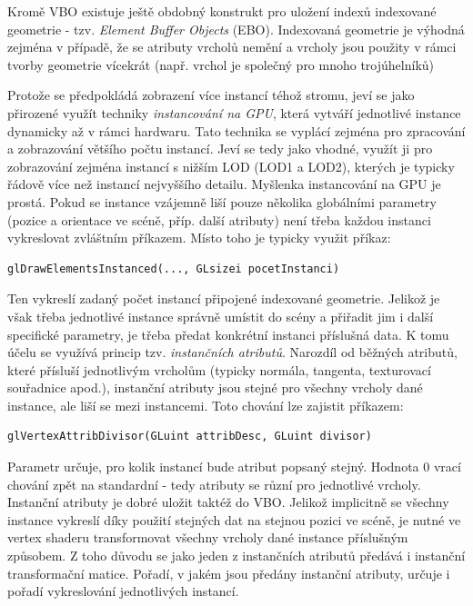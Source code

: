 Kromě VBO existuje ještě obdobný konstrukt pro uložení indexů indexované geometrie - tzv. \emph{Element Buffer Objects} (EBO). Indexovaná geometrie je výhodná zejména v případě, že se atributy vrcholů nemění a vrcholy jsou použity v rámci tvorby geometrie vícekrát (např. vrchol je společný pro mnoho trojúhelníků)

Protože se předpokládá zobrazení více instancí téhož stromu, jeví se jako přirozené využít techniky \emph{instancování na GPU}, která vytváří jednotlivé instance dynamicky až v rámci hardwaru. Tato technika se vyplácí zejména pro zpracování a zobrazování většího počtu instancí. Jeví se tedy jako vhodné, využít ji pro zobrazování zejména instancí s nižším LOD (LOD1 a LOD2), kterých je typicky řádově více než instancí nejvyššího detailu. Myšlenka instancování na GPU je prostá. Pokud se instance vzájemně liší pouze několika globálními parametry (pozice a orientace ve scéně, příp. další atributy) není třeba každou instanci vykreslovat zvláštním příkazem. Místo toho je typicky využit příkaz:
\begin{verbatim}glDrawElementsInstanced(..., GLsizei pocetInstanci)\end{verbatim}
Ten vykreslí zadaný počet instancí připojené indexované geometrie. Jelikož je však třeba jednotlivé instance správně umístit do scény a přiřadit jim i další specifické parametry, je třeba předat konkrétní instanci příslušná data. K tomu účelu se využívá princip tzv. \emph{instančních atributů}. Narozdíl od běžných atributů, které přísluší jednotlivým vrcholům (typicky normála, tangenta, texturovací souřadnice apod.), instanční atributy jsou stejné pro všechny vrcholy dané instance, ale liší se mezi instancemi. Toto chování lze zajistit příkazem:
\begin{verbatim}glVertexAttribDivisor(GLuint attribDesc, GLuint divisor)\end{verbatim}
Parametr  určuje, pro kolik instancí bude atribut popsaný  stejný. Hodnota $0$ vrací chování zpět na standardní - tedy atributy se různí pro jednotlivé vrcholy.
Instanční atributy je dobré uložit taktéž do VBO. Jelikož implicitně se všechny instance vykreslí díky použití stejných dat na stejnou pozici ve scéně, je nutné ve vertex shaderu transformovat všechny vrcholy dané instance příslušným způsobem. Z toho důvodu se jako jeden z instančních atributů předává i instanční transformační matice. Pořadí, v jakém jsou předány instanční atributy, určuje i pořadí vykreslování jednotlivých instancí.

